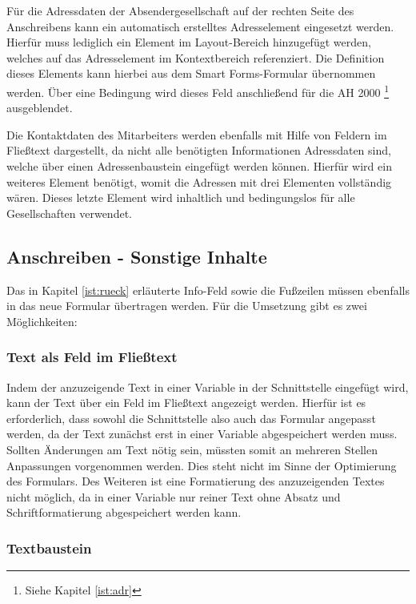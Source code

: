 Für die Adressdaten der Absendergesellschaft auf der rechten Seite des Anschreibens kann ein automatisch erstelltes Adresselement eingesetzt werden. Hierfür muss lediglich ein Element im Layout-Bereich hinzugefügt werden, welches auf das Adresselement im Kontextbereich referenziert. Die Definition dieses Elements kann hierbei aus dem Smart Forms-Formular übernommen werden. Über eine Bedingung wird dieses Feld anschließend für die \ac{AH} 2000 \footnote{Siehe Kapitel \ref{ist:adr}} ausgeblendet.

Die Kontaktdaten des Mitarbeiters werden ebenfalls mit Hilfe von Feldern im Fließtext dargestellt, da nicht alle benötigten Informationen Adressdaten sind, welche über einen Adressenbaustein eingefügt werden können. Hierfür wird ein weiteres Element benötigt, womit die Adressen mit drei Elementen vollständig wären. Dieses letzte Element wird inhaltlich und bedingungslos für alle Gesellschaften verwendet.

\subsection{Anschreiben - Sonstige Inhalte}

Das in Kapitel \ref{ist:rueck} erläuterte Info-Feld sowie die Fußzeilen müssen ebenfalls in das neue Formular übertragen werden. Für die Umsetzung gibt es zwei Möglichkeiten:

\subsubsection{Text als Feld im Fließtext}

Indem der anzuzeigende Text in einer Variable in der Schnittstelle eingefügt wird, kann der Text über ein Feld im Fließtext angezeigt werden. Hierfür ist es erforderlich, dass sowohl die Schnittstelle also auch das Formular angepasst werden, da der Text zunächst erst in einer Variable abgespeichert werden muss. Sollten Änderungen am Text nötig sein, müssten somit an mehreren Stellen Anpassungen vorgenommen werden. Dies steht nicht im Sinne der Optimierung des Formulars. Des Weiteren ist eine Formatierung des anzuzeigenden Textes nicht möglich, da in einer Variable nur reiner Text ohne Absatz und Schriftformatierung abgespeichert werden kann.

\subsubsection{Textbaustein}

